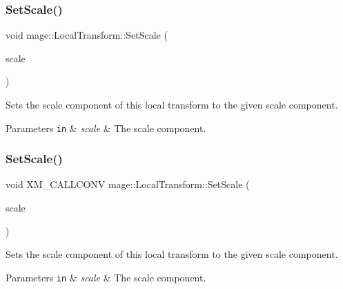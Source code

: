 \subsubsection{\texorpdfstring{Set\+Scale()}{SetScale()}\hspace{0.1cm}{\footnotesize\ttfamily [3/4]}}
{\footnotesize\ttfamily void mage\+::\+Local\+Transform\+::\+Set\+Scale (\begin{DoxyParamCaption}\item[{\mbox{\hyperlink{namespacemage_a1e3c7a882af461f161caa1cbddaf1fa2}{F32x3}}}]{scale }\end{DoxyParamCaption})\hspace{0.3cm}{\ttfamily [noexcept]}}

Sets the scale component of this local transform to the given scale component.


\begin{DoxyParams}[1]{Parameters}
\mbox{\tt in}  & {\em scale} & The scale component. \\
\hline
\end{DoxyParams}
\mbox{\label{classmage_1_1_local_transform_a2f8086f72f3c72a641db1b59e8b3e9c0}} 
\subsubsection{\texorpdfstring{Set\+Scale()}{SetScale()}\hspace{0.1cm}{\footnotesize\ttfamily [4/4]}}
{\footnotesize\ttfamily void X\+M\+\_\+\+C\+A\+L\+L\+C\+O\+NV mage\+::\+Local\+Transform\+::\+Set\+Scale (\begin{DoxyParamCaption}\item[{F\+X\+M\+V\+E\+C\+T\+OR}]{scale }\end{DoxyParamCaption})\hspace{0.3cm}{\ttfamily [noexcept]}}

Sets the scale component of this local transform to the given scale component.


\begin{DoxyParams}[1]{Parameters}
\mbox{\tt in}  & {\em scale} & The scale component. \\
\hline
\end{DoxyParams}
\mbox{\label{classmage_1_1_local_transform_afaab2f329bb986de112e76ba8407b84e}} 
